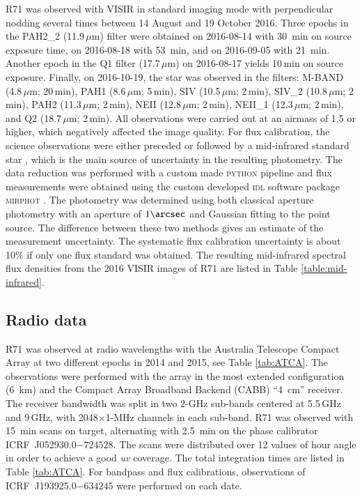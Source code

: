 \documentclass[structabstract]{aa}
\begin{document}
R71 was observed with VISIR in standard imaging mode with perpendicular nodding several times between 14 August and 19 October 2016. 
Three epochs in the PAH2\_2 (11.9\,$\mu$m) filter were obtained on
2016-08-14 with 30~min on source exposure time, on 2016-08-18 with 53~min, and on 2016-09-05 with 21~min. Another epoch in the Q1 filter (17.7\,$\mu$m) on 2016-08-17 yields 10\,min on source exposure. Finally, on 2016-10-19, the star was observed in the filters: M-BAND
(4.8\,$\mu$m; 20\,min), PAH1 (8.6\,$\mu$m; 5\,min), SIV (10.5\,$\mu$m; 2\,min), SIV\_2
(10.8\,$\mu$m; 2\,min), PAH2 (11.3\,$\mu$m; 2\,min), NEII (12.8\,$\mu$m; 2\,min), NEII\_1
(12.3\,$\mu$m; 2\,min), and Q2 (18.7\,$\mu$m; 2\,min).
All observations were carried out at an airmass of 1.5 or higher, which negatively affected the image quality.
For flux calibration, the science observations were either preceded or followed by a mid-infrared standard star  \citep{1999AJ....117.1864C}, which is the main source of uncertainty in the resulting photometry.
The data reduction was performed with a custom made \textsc{python} pipeline and flux
measurements were obtained using the custom developed \textsc{idl} software package
\textsc{mirphot} \citep{2014MNRAS.439.1648A}.
The photometry was determined using both classical aperture photometry with an aperture of $1\arcsec$ and Gaussian fitting to the point source.
The difference between these two methods gives an estimate of the measurement uncertainty. The systematic flux calibration uncertainty is about 10\% if only one flux standard was obtained. The resulting mid-infrared spectral flux densities from the 2016 VISIR images of R71 are listed in Table \ref{table:mid-infrared}.



\subsection{Radio data}


R71 was observed at radio wavelengths with the Australia Telescope Compact Array at two different epochs in 2014 and 2015, see Table \ref{tab:ATCA}. The observations were performed with the array in the most extended configuration (6~km) and the Compact Array Broadband Backend (CABB) ``4~cm'' receiver. The 
receiver bandwidth was split in two 2-GHz sub-bands centered at
\hbox{5.5\,GHz} and \hbox{9\,GHz}, with 2048$\times$1-MHz channels in each sub-band. R71 was observed with 15~min scans on target, alternating with 2.5~min on the phase calibrator ICRF~J052930.0$-724528$. The scans were distributed over 12 values of hour angle in order to achieve a good \emph{uv} coverage. The total integration times are listed in Table \ref{tab:ATCA}. For bandpass and flux calibrations, observations of ICRF~J193925.0$-634245$ were performed on each date. 
\end{document}
